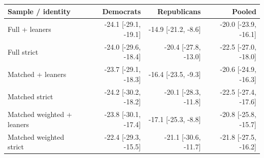 \begin{tabular}{lrrr}
\toprule
Sample / identity & Democrats & Republicans & Pooled \\
\midrule
Full + leaners & -24.1 [-29.1, -19.1] & -14.9 [-21.2, -8.6] & -20.0 [-23.9, -16.1] \\
Full strict & -24.0 [-29.6, -18.4] & -20.4 [-27.8, -13.0] & -22.5 [-27.0, -18.0] \\
Matched + leaners & -23.7 [-29.1, -18.3] & -16.4 [-23.5, -9.3] & -20.6 [-24.9, -16.3] \\
Matched strict & -24.2 [-30.2, -18.2] & -20.1 [-28.3, -11.8] & -22.5 [-27.4, -17.6] \\
Matched weighted + leaners & -23.8 [-30.1, -17.4] & -17.1 [-25.3, -8.8] & -20.8 [-25.8, -15.7] \\
Matched weighted strict & -22.4 [-29.3, -15.5] & -21.1 [-30.6, -11.7] & -21.8 [-27.5, -16.2] \\
\bottomrule
\end{tabular}

